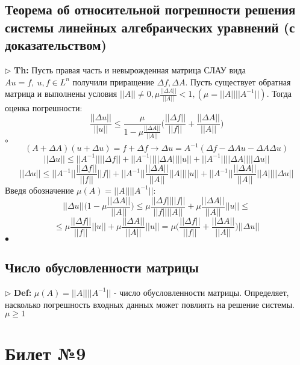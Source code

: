 \documentclass[a4paper]{article}
\begin{document}
\subsection{Теорема об относительной погрешности решения системы линейных алгебраических уравнений (с доказательством)}
$\triangleright$ \textbf{Th:} Пусть правая часть и невырожденная матрица СЛАУ вида $Au=f,\ u,f \in L^n$ получили приращение $\Delta f, \Delta A$. Пусть существует обратная матрица и выполнены условия $||A|| \neq 0, \mu \frac{||\Delta A||}{||A||} < 1, (\mu=||A|| ||A^{-1}||)$. Тогда оценка погрешности:
$$ \frac{||\Delta u||}{||u||} \leq \frac{\mu}{1-\mu \frac{||\Delta A||}{||A||}} \bigg( \frac{||\Delta f||}{||f||} + \frac{||\Delta A||}{||A||} \bigg)$$
	$\circ$ 
		$$ (A + \Delta A)(u+\Delta u)=f+\Delta f \rightarrow \Delta u = A^{-1}(\Delta f - \Delta Au - \Delta A \Delta u)$$
		$$ ||\Delta u|| \leq ||A^{-1}|| ||\Delta f|| + ||A^{-1}|| ||\Delta A|| ||u|| + ||A^{-1}|| ||\Delta A|| ||\Delta u|| $$
		$$ ||\Delta u|| \leq ||A^{-1}|| \frac{||\Delta f||}{||f||} ||f|| + ||A^{-1}|| \frac{||\Delta A||}{||A||} ||A|| ||u|| + ||A^{-1}|| \frac{||\Delta A||}{||A||} ||A|| ||\Delta u||  $$
		Введя обозначение $\mu (A)=||A|| ||A^{-1}||$:
		$$ ||\Delta u || \big( 1- \mu \frac{||\Delta A||}{||A||} \big) \leq \mu \frac{||\Delta f|| ||f||}{||f|| ||A||} + \mu \frac{||\Delta A||}{||A||} ||u|| \leq $$
		$$ \leq \mu \frac{||\Delta f||}{||f||} ||u|| + \mu \frac{||\Delta A||}{||A||}||u|| = \mu \bigg( \frac{||\Delta f||}{||f||} + \frac{||\Delta A||}{||A||} \bigg) ||\Delta u||$$
	$\bullet$

\subsection{Число обусловленности матрицы}
$\triangleright$ \textbf{Def:} $\mu(A) = ||A|| ||A^{-1}||$ - число обусловленности матрицы. Определяет, насколько погрешность входных данных может повлиять на решение системы. $\mu \geq 1$

\section{Билет №9}
\end{document}
